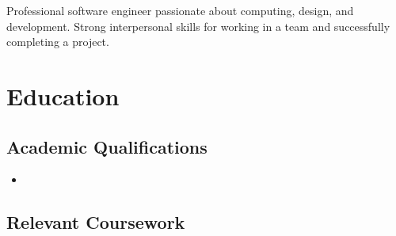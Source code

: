 \documentclass[11pt,a4paper,roman]{moderncv}        %
\begin{document}
\makecvtitle

\vspace{0pt}

\small{Professional software engineer passionate about computing, design, and development. Strong interpersonal skills for working in a team and successfully completing a project.}

\section{Education}

\vspace{0pt}

\subsection{Academic Qualifications}

\vspace{0pt}

\begin{itemize}

\item{}

\end{itemize}

\vspace{2pt}

\subsection{Relevant Coursework}

\vspace{1pt}
\end{document}
